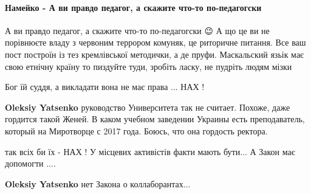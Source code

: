 
 
 
 
 
\paragraph{Намейко - А ви правдо педагог, а скажите что-то по-педагогски}

\begin{itemize}


А ви правдо педагог, а скажите что-то по-педагогски 😉 А що це ви не порівнюєте
владу з червоним террором комуняк, це риторичне питання. Все ваш пост построїн
із тез кремлівської методички, а де пруфи. Маскальский язьік має свою етнічну
країну то пиздуйте туди, зробіть ласку, не пудріть людям мізки



Бог їй суддя, а викладати вона не має права ... НАХ !

\begin{itemize}

\textbf{Oleksiy Yatsenko} руководство Университета так не считает. Похоже, даже гордится такой Женей. В каком учебном заведении Украины есть преподаватель, который на Миротворце с 2017 года. Боюсь, что она гордость ректора.


так всіх би їх - НАХ ! У місцевих активістів факти мають бути... А Закон має допомогти ....


\textbf{Oleksiy Yatsenko} нет Закона о коллаборантах...
\end{itemize}


\end{itemize}
